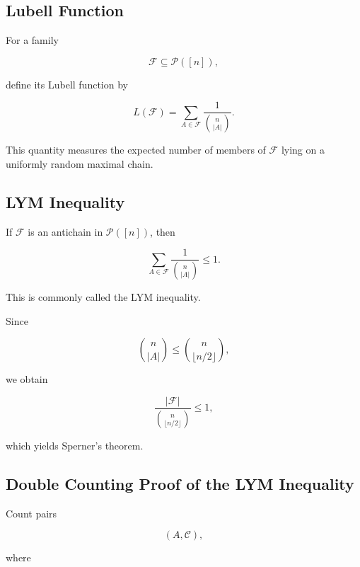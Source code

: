 \subsection{Lubell Function}
\label{subsec:lubell-function}

For a family

\[
\mathcal{F}
\subseteq
\mathcal{P}([n]),
\]

define its Lubell function by

\[
\boxed{
L(\mathcal{F})
=
\sum_{A\in\mathcal{F}}
\frac{1}{\binom{n}{|A|}}.
}
\]

This quantity measures the expected number of members of
\(\mathcal{F}\) lying on a uniformly random maximal chain.

\subsection{LYM Inequality}
\label{subsec:lym-inequality}

\begin{theorem}
If \(\mathcal{F}\) is an antichain in \(\mathcal{P}([n])\), then

\[
\boxed{
\sum_{A\in\mathcal{F}}
\frac{1}{\binom{n}{|A|}}
\leq1.
}
\]
\end{theorem}

This is commonly called the LYM inequality.

Since

\[
\binom{n}{|A|}
\leq
\binom{n}{\lfloor n/2\rfloor},
\]

we obtain

\[
\frac{|\mathcal{F}|}{
\binom{n}{\lfloor n/2\rfloor}
}
\leq1,
\]

which yields Sperner's theorem.

\subsection{Double Counting Proof of the LYM Inequality}
\label{subsec:lym-double-counting}

Count pairs

\[
(A,\mathcal{C}),
\]

where

